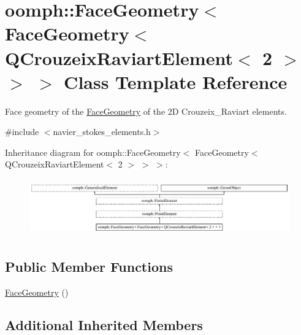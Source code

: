 \hypertarget{classoomph_1_1FaceGeometry_3_01FaceGeometry_3_01QCrouzeixRaviartElement_3_012_01_4_01_4_01_4}{}\section{oomph\+:\+:Face\+Geometry$<$ Face\+Geometry$<$ Q\+Crouzeix\+Raviart\+Element$<$ 2 $>$ $>$ $>$ Class Template Reference}
\label{classoomph_1_1FaceGeometry_3_01FaceGeometry_3_01QCrouzeixRaviartElement_3_012_01_4_01_4_01_4}


Face geometry of the \hyperlink{classoomph_1_1FaceGeometry}{Face\+Geometry} of the 2D Crouzeix\+\_\+\+Raviart elements.  




{\ttfamily \#include $<$navier\+\_\+stokes\+\_\+elements.\+h$>$}

Inheritance diagram for oomph\+:\+:Face\+Geometry$<$ Face\+Geometry$<$ Q\+Crouzeix\+Raviart\+Element$<$ 2 $>$ $>$ $>$\+:\begin{figure}[H]
\begin{center}
\leavevmode
\includegraphics[height=2.477876cm]{classoomph_1_1FaceGeometry_3_01FaceGeometry_3_01QCrouzeixRaviartElement_3_012_01_4_01_4_01_4}
\end{center}
\end{figure}
\subsection*{Public Member Functions}
\begin{DoxyCompactItemize}
\item 
\hyperlink{classoomph_1_1FaceGeometry_3_01FaceGeometry_3_01QCrouzeixRaviartElement_3_012_01_4_01_4_01_4_a1068b29c8a6a4e3c0c842eaa578f221e}{Face\+Geometry} ()
\end{DoxyCompactItemize}
\subsection*{Additional Inherited Members}


